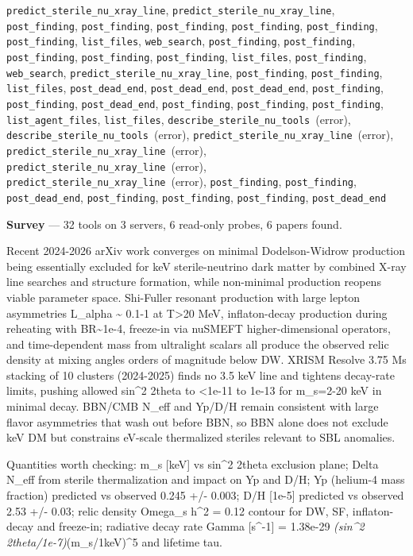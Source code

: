 \documentclass[11pt,a4paper]{article}
\begin{document}
\texttt{predict\_sterile\_nu\_xray\_line}, \texttt{predict\_sterile\_nu\_xray\_line}, \texttt{post\_finding}, \texttt{post\_finding}, \texttt{post\_finding}, \texttt{post\_finding}, \texttt{post\_finding}, \texttt{post\_finding}, \texttt{list\_files}, \texttt{web\_search}, \texttt{post\_finding}, \texttt{post\_finding}, \texttt{post\_finding}, \texttt{post\_finding}, \texttt{post\_finding}, \texttt{list\_files}, \texttt{post\_finding}, \texttt{web\_search}, \texttt{predict\_sterile\_nu\_xray\_line}, \texttt{post\_finding}, \texttt{post\_finding}, \texttt{list\_files}, \texttt{post\_dead\_end}, \texttt{post\_dead\_end}, \texttt{post\_dead\_end}, \texttt{post\_finding}, \texttt{post\_finding}, \texttt{post\_dead\_end}, \texttt{post\_finding}, \texttt{post\_finding}, \texttt{post\_finding}, \texttt{list\_agent\_files}, \texttt{list\_files}, \texttt{describe\_sterile\_nu\_tools}~(error), \texttt{describe\_sterile\_nu\_tools}~(error), \texttt{predict\_sterile\_nu\_xray\_line}~(error), \texttt{predict\_sterile\_nu\_xray\_line}~(error), \texttt{predict\_sterile\_nu\_xray\_line}~(error), \texttt{predict\_sterile\_nu\_xray\_line}~(error), \texttt{post\_finding}, \texttt{post\_finding}, \texttt{post\_dead\_end}, \texttt{post\_finding}, \texttt{post\_finding}, \texttt{post\_finding}, \texttt{post\_dead\_end}\par
\textbf{Survey} --- 32 tools on 3 servers, 6 read-only probes, 6 papers found.

Recent 2024-2026 arXiv work converges on minimal Dodelson-Widrow production being essentially excluded for keV sterile-neutrino dark matter by combined X-ray line searches and structure formation, while non-minimal production reopens viable parameter space. Shi-Fuller resonant production with large lepton asymmetries L\_alpha \textasciitilde{} 0.1-1 at T\textgreater{}20 MeV, inflaton-decay production during reheating with BR\textasciitilde{}1e-4, freeze-in via nuSMEFT higher-dimensional operators, and time-dependent mass from ultralight scalars all produce the observed relic density at mixing angles orders of magnitude below DW. XRISM Resolve 3.75 Ms stacking of 10 clusters (2024-2025) finds no 3.5 keV line and tightens decay-rate limits, pushing allowed sin\textasciicircum{}2 2theta to \textless{}1e-11 to 1e-13 for m\_s=2-20 keV in minimal decay. BBN/CMB N\_eff and Yp/D/H remain consistent with large flavor asymmetries that wash out before BBN, so BBN alone does not exclude keV DM but constrains eV-scale thermalized steriles relevant to SBL anomalies.

Quantities worth checking: m\_s [keV] vs sin\textasciicircum{}2 2theta exclusion plane; Delta N\_eff from sterile thermalization and impact on Yp and D/H; Yp (helium-4 mass fraction) predicted vs observed 0.245 +/- 0.003; D/H [1e-5] predicted vs observed 2.53 +/- 0.03; relic density Omega\_s h\textasciicircum{}2 = 0.12 contour for DW, SF, inflaton-decay and freeze-in; radiative decay rate Gamma [s\textasciicircum{}-1] = 1.38e-29 \textit{ (sin\textasciicircum{}2 2theta/1e-7)}(m\_s/1keV)\textasciicircum{}5 and lifetime tau.
\end{document}
